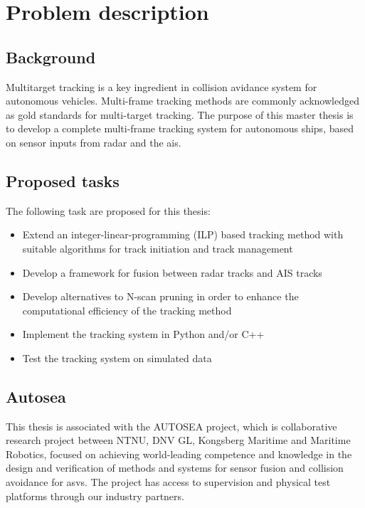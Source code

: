 
\section*{Problem description}

\subsection*{Background}\label{sub:background}
Multitarget tracking is a key ingredient in collision avidance system for autonomous vehicles. Multi-frame tracking methods are commonly acknowledged as gold standards for multi-target tracking. The purpose of this master thesis is to develop a complete multi-frame tracking system for autonomous ships, based on sensor inputs from radar and the \gls{ais}.

\subsection*{Proposed tasks}\label{sub:proposed_tasks}
The following task are proposed for this thesis:
\begin{itemize}
	\item{Extend an integer-linear-programming (ILP) based tracking method with suitable algorithms for track initiation and track management}
	\item{Develop a framework for fusion between radar tracks and AIS tracks}
	\item{Develop alternatives to N-scan pruning in order to enhance the computational efficiency of the tracking method}
	\item{Implement the tracking system in Python and/or C++}
	\item{Test the tracking system on simulated data}
\end{itemize}

\subsection*{Autosea}\label{sub:autosea}
This thesis is associated with the AUTOSEA project, which is collaborative research project between NTNU, DNV GL, Kongsberg Maritime and Maritime Robotics, focused on achieving world-leading competence and knowledge in the design and verification of methods and systems for sensor fusion and collision avoidance for \glspl{asv}. The project has access to supervision and physical test platforms through our industry partners.